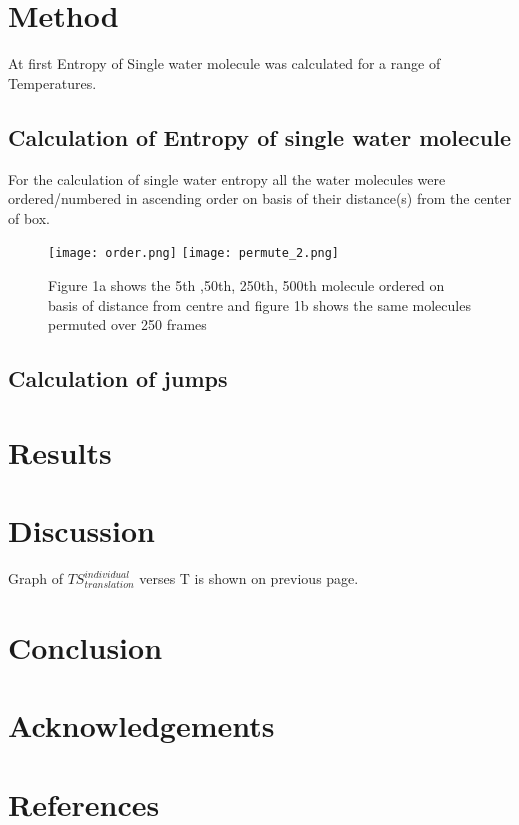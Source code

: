\documentclass{article}[a4paper,12pt,twoside]
\begin{document}
\section{Method}
At first Entropy of Single water molecule was calculated for a range of Temperatures.
\subsection{Calculation of Entropy of single water molecule}
For the calculation of single water entropy all the water molecules were ordered/numbered in ascending order on basis of their distance(s) from the center of box. \begin{figure}
\texttt{[image: order.png]}
\texttt{[image: permute\_2.png]}
\caption{Figure 1a shows the 5th ,50th, 250th, 500th molecule ordered on basis of distance from centre and figure 1b shows the same molecules permuted over 250 frames }
\end{figure}
\subsection{Calculation of jumps}
\section{Results}

\section{Discussion}
Graph of $ TS^{individual}_{translation} $ verses T is shown on previous page.

\section{Conclusion}

\section{Acknowledgements}

\section{References}
\end{document}
